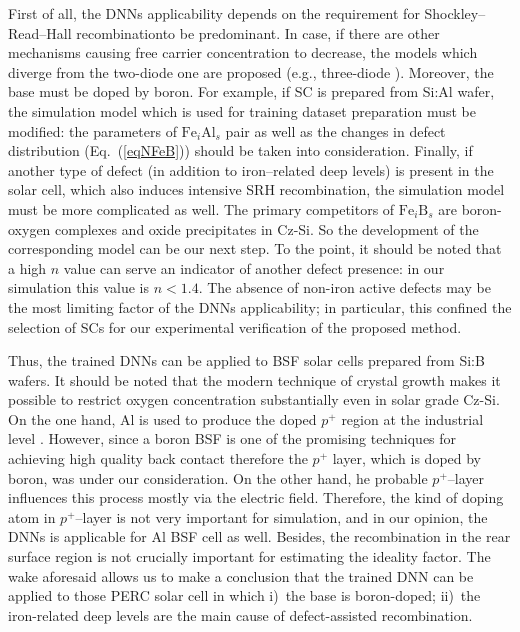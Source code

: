 \documentclass[num-refs]{wiley-article} %
\begin{document}
First of all, the DNNs applicability depends on the requirement for Shockley–Read–Hall recombinationto be predominant.
In case,
if there are other mechanisms causing free carrier concentration to decrease,
the models which diverge from the two-diode one are proposed
(e.g., three-diode \cite{TreeDiode,Shah}).
Moreover, the base must be doped by boron.
For example, if SC is prepared from Si:Al wafer,
the simulation model which is used for training dataset preparation must be modified:
the parameters of $\mathrm{Fe}_i\mathrm{Al}_s$ pair as well as
the changes in defect distribution (Eq.~(\ref{eqNFeB})) should be taken into consideration.
Finally, if another type of defect (in addition to iron--related deep levels)
is present in the solar cell, which also induces intensive SRH recombination,
the simulation model must be more complicated as well.
The primary competitors of $\mathrm{Fe}_i\mathrm{B}_s$  are  boron-oxygen complexes \cite{LIDRev,LIDRev2}
and oxide precipitates \cite{MurphySC2014,Oxide:Chen} in Cz-Si.
So the development of the corresponding model can be our next step.
To the point, it should be noted that a high $n$ value can serve an indicator of another defect presence:
in our simulation this value is $n<1.4$.
The absence of non-iron active defects may be the most limiting factor of the DNNs applicability;
in particular, this confined the selection of SCs for our experimental verification of the proposed method.


Thus, the trained DNNs can be applied to BSF solar cells prepared from Si:B wafers.
It should be noted that the modern  technique of crystal growth
makes it possible to restrict
oxygen concentration substantially even in solar grade Cz-Si.
On the one hand,  Al is used to produce the doped $p^+$ region
at the industrial level \cite{GreenRew2019,WilsonRew2020}.
However, since a boron BSF is one of the promising techniques
for achieving high quality back contact \cite{Kim2007,B-BSF}
therefore the $p^{+}$ layer, which is doped by boron, was under our consideration.
On the other hand, 
he probable $p^+$--layer influences this process mostly via the electric field.
Therefore, the kind of doping atom in $p^+$--layer is not very important for simulation,
and in our opinion, the  DNNs is applicable for Al BSF cell as well.
Besides, the recombination in the rear surface region is not crucially important for estimating the ideality factor.
The wake aforesaid allows us to make a conclusion that
the trained DNN can be applied to those PERC solar cell in which
i)~the base is boron-doped;
ii)~the iron-related deep levels are the main cause of defect-assisted recombination.
\end{document}

